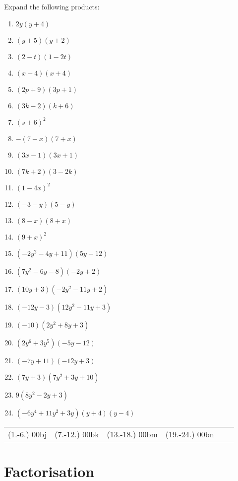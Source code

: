 \begin{exercises}{}
{Expand the following products:

\begin{multicols}{2}
\begin{enumerate}[label=\textbf{\arabic*}., itemsep=5pt]
\item $2y(y+4)$ 
\item $(y+5)(y+2) $
\item $(2-t)(1-2t)$
\item $(x-4)(x+4)$
\item $ (2p+9)(3p+1)$
\item $(3k-2)(k+6)$
\item $(s+6)^2$
\item $-(7-x)(7+x)$
\item $(3x-1)(3x+1)$
\item $(7k+2)(3-2k)$
\item $(1-4x)^2$
\item $(-3-y)(5-y)$
\item $(8-x)(8+x)$
\item $(9+x)^2$
\item $(-2{y}^{2}-4y+11)(5y-12)$ 
\item $(7{y}^{2}-6y-8)(-2y+2)$%
\item $(10{y}+3)(-2{y}^{2}-11y+2)$ 
\item $(-12y-3)(12{y}^{2}-11y+3)$%
\item $(-10)(2{y}^{2}+8y+3)$ 
\item $(2{y}^{6}+3{y}^{5})(-5y-12)$%
\item $(-7y+11)(-12y+3)$%
\item $(7y+3)(7{y}^{2}+3y+10)$%
\item $9(8{y}^{2}-2y+3)$ 
\item $(-6{y}^{4}+11{y}^{2}+3y)(y+4)(y-4)$ 
\end{enumerate}
\end{multicols}
\practiceinfo 
\par 
 \par \begin{tabular}[h]{cccccc}
 (1.-6.) 00bj&  (7.-12.) 00bk&  (13.-18.) 00bm& (19.-24.) 00bn\end{tabular}
}
\end{exercises}



\section{Factorisation}


